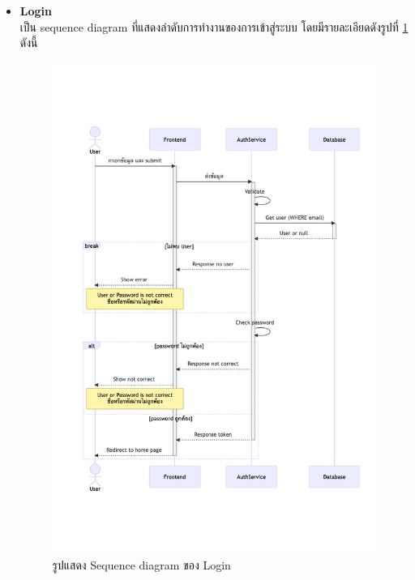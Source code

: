 \documentclass[12pt,oneside,openright,a4paper]{cpe-thai-project}
\begin{document}
\begin{itemize}
    \newpage
    \item \textbf{Login} \\
    เป็น sequence diagram ที่แสดงลำดับการทำงานของการเข้าสู่ระบบ โดยมีรายละเอียดดังรูปที่ \ref{fig:sqLogin} ดังนี้
    \begin{figure}[!ht]\centering
        \includegraphics[width=15cm, trim={1cm 5cm 0.5cm 5cm},clip]{./assets/sequence-diagram/login.png}
        \caption{รูปแสดง Sequence diagram ของ Login}\label{fig:sqLogin}
    \end{figure}


\end{itemize}
\end{document}
